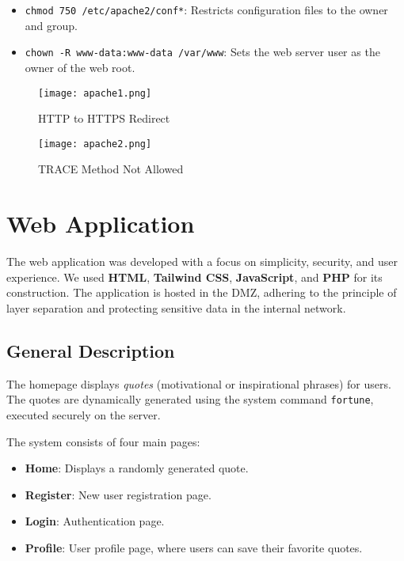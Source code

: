 \documentclass[12pt]{report}
\begin{document}
\begin{itemize}
\item \texttt{chmod 750 /etc/apache2/conf*}: Restricts configuration files to the owner and group.
\item \texttt{chown -R www-data:www-data /var/www}: Sets the web server user as the owner of the web root.
\end{itemize}

\vspace{1cm}

\begin{figure}[h]
    \centering
    \texttt{[image: apache1.png]}
    \caption{HTTP to HTTPS Redirect}
    \label{fig:identifier}
\end{figure}

\begin{figure}[h]
    \centering
    \texttt{[image: apache2.png]}
    \caption{TRACE Method Not Allowed}
    \label{fig:identifier}
\end{figure}

\newpage

\section*{Web Application}

The web application was developed with a focus on simplicity, security, and user experience. We used \textbf{HTML}, \textbf{Tailwind CSS}, \textbf{JavaScript}, and \textbf{PHP} for its construction. The application is hosted in the DMZ, adhering to the principle of layer separation and protecting sensitive data in the internal network.

\subsection*{General Description}

The homepage displays \textit{quotes} (motivational or inspirational phrases) for users. The quotes are dynamically generated using the system command \texttt{fortune}, executed securely on the server.

The system consists of four main pages:
\begin{itemize}
    \item \textbf{Home}: Displays a randomly generated quote.
    \item \textbf{Register}: New user registration page.
    \item \textbf{Login}: Authentication page.
    \item \textbf{Profile}: User profile page, where users can save their favorite quotes.
\end{itemize}
\end{document}
